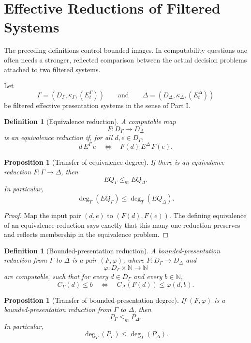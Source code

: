 \documentclass[11pt]{article}
\newtheorem{proposition}[theorem]{Proposition}
\newtheorem{definition}[theorem]{Definition}
\begin{document}
\section{Effective Reductions of Filtered Systems}

The preceding definitions control bounded images.  In computability questions one often needs a stronger, reflected comparison between the actual decision problems attached to two filtered systems.

Let
\[
\Gamma=(D_\Gamma,\kappa_\Gamma,(E_t^\Gamma))
\qquad\text{and}\qquad
\Delta=(D_\Delta,\kappa_\Delta,(E_t^\Delta))
\]
be filtered effective presentation systems in the sense of Part I.

\begin{definition}[Equivalence reduction]
A computable map
\[
F:D_\Gamma\to D_\Delta
\]
is an equivalence reduction if, for all \(d,e\in D_\Gamma\),
\[
d\,E^\Gamma\,e
\quad\Longleftrightarrow\quad
F(d)\,E^\Delta\,F(e).
\]
\end{definition}

\begin{proposition}[Transfer of equivalence degree]
If there is an equivalence reduction \(F:\Gamma\to\Delta\), then
\[
EQ_\Gamma\leq_m EQ_\Delta.
\]
In particular,
\[
\deg_T(EQ_\Gamma)\leq \deg_T(EQ_\Delta).
\]
\end{proposition}

\begin{proof}
Map the input pair \((d,e)\) to \((F(d),F(e))\).  The defining equivalence of an equivalence reduction says exactly that this many-one reduction preserves and reflects membership in the equivalence problem.
\end{proof}

\begin{definition}[Bounded-presentation reduction]
A bounded-presentation reduction from \(\Gamma\) to \(\Delta\) is a pair \((F,\varphi)\), where \(F:D_\Gamma\to D_\Delta\) and
\[
\varphi:D_\Gamma\times\mathbb N\to\mathbb N
\]
are computable, such that for every \(d\in D_\Gamma\) and every \(b\in\mathbb N\),
\[
C_\Gamma(d)\leq b
\quad\Longleftrightarrow\quad
C_\Delta(F(d))\leq \varphi(d,b).
\]
\end{definition}

\begin{proposition}[Transfer of bounded-presentation degree]
If \((F,\varphi)\) is a bounded-presentation reduction from \(\Gamma\) to \(\Delta\), then
\[
P_\Gamma\leq_m P_\Delta.
\]
In particular,
\[
\deg_T(P_\Gamma)\leq \deg_T(P_\Delta).
\]
\end{proposition}
\end{document}

